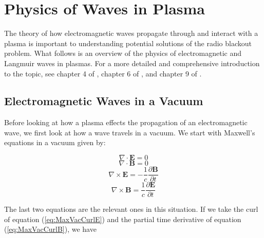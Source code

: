 \documentclass[twocolumn]{article}
\begin{document}
\section{Physics of Waves in Plasma} \label{sec:Waves}
The theory of how electromagnetic waves propagate through and interact with a plasma is important to understanding potential solutions of the radio blackout problem.
What follows is an overview of the physics of electromagnetic and Langmuir waves in plasmas.
For a more detailed and comprehensive introduction to the topic, see chapter 4 of \cite{chen_introduction_1984}, chapter 6 of \cite{papas_theory_1965}, and chapter 9 of \cite{fitzpatrick_maxwells_2008}.

\subsection*{Electromagnetic Waves in a Vacuum}
Before looking at how a plasma effects the propagation of an electromagnetic wave, we first look at how a wave travels in a vacuum.
We start with Maxwell's equations in a vacuum given by:

\begin{equation}
	\nabla \cdot \mathbf{E} = 0
\end{equation}
\begin{equation}
	\nabla \cdot \mathbf{B} = 0
\end{equation}
\begin{equation} 
	\label{eq:MaxVacCurlE}
	\nabla \times \mathbf{E} = -\frac{1}{c} \frac{\partial \mathbf{B}}{\partial t}
\end{equation}
\begin{equation} 
	\label{eq:MaxVacCurlB}
	\nabla \times \mathbf{B} = \frac{1}{c} \frac{\partial \mathbf{E}}{\partial t}
\end{equation}

The last two equations are the relevant ones in this situation.
If we take the curl of equation (\ref{eq:MaxVacCurlE}) and the partial time derivative of equation (\ref{eq:MaxVacCurlB}), we have
\end{document}

